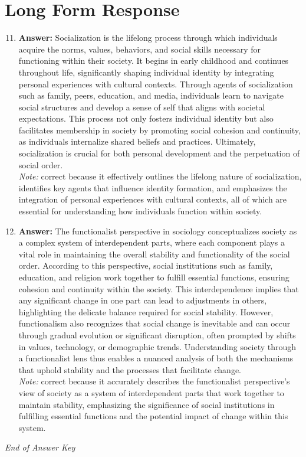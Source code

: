 \documentclass[12pt]{article}
\begin{document}
\section*{Long Form Response}
\begin{enumerate}[label=\arabic*.]
\setcounter{enumi}{10}
\item \textbf{Answer:} Socialization is the lifelong process through which individuals acquire the norms, values, behaviors, and social skills necessary for functioning within their society. It begins in early childhood and continues throughout life, significantly shaping individual identity by integrating personal experiences with cultural contexts. Through agents of socialization such as family, peers, education, and media, individuals learn to navigate social structures and develop a sense of self that aligns with societal expectations. This process not only fosters individual identity but also facilitates membership in society by promoting social cohesion and continuity, as individuals internalize shared beliefs and practices. Ultimately, socialization is crucial for both personal development and the perpetuation of social order.
\\ \textit{Note:} correct because it effectively outlines the lifelong nature of socialization, identifies key agents that influence identity formation, and emphasizes the integration of personal experiences with cultural contexts, all of which are essential for understanding how individuals function within society.
\item \textbf{Answer:} The functionalist perspective in sociology conceptualizes society as a complex system of interdependent parts, where each component plays a vital role in maintaining the overall stability and functionality of the social order. According to this perspective, social institutions such as family, education, and religion work together to fulfill essential functions, ensuring cohesion and continuity within the society. This interdependence implies that any significant change in one part can lead to adjustments in others, highlighting the delicate balance required for social stability. However, functionalism also recognizes that social change is inevitable and can occur through gradual evolution or significant disruption, often prompted by shifts in values, technology, or demographic trends. Understanding society through a functionalist lens thus enables a nuanced analysis of both the mechanisms that uphold stability and the processes that facilitate change.
\\ \textit{Note:} correct because it accurately describes the functionalist perspective's view of society as a system of interdependent parts that work together to maintain stability, emphasizing the significance of social institutions in fulfilling essential functions and the potential impact of change within this system.
\end{enumerate}

\vfill
\noindent\textit{End of Answer Key}
\end{document}

